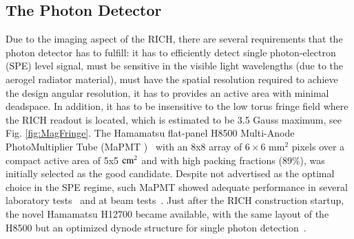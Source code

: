 \documentclass[5p,times,twocolumn]{elsarticle}
\def\MaPMT{MaPMT }
\begin{document}
\subsection{The Photon Detector}
Due to the imaging aspect of the RICH, there are several requirements that the photon detector has to fulfill: it has to efficiently detect single photon-electron (SPE) level signal, must be sensitive in the visible light wavelengths (due to the aerogel radiator material), must have the spatial resolution required to achieve the design angular resolution, it has to provides an active area with minimal deadspace. 
In addition, it has to be insensitive to the low torus fringe field where the RICH readout is located, which is estimated to be 3.5 Gauss maximum, see Fig. \ref{fig:MagFringe}.
The Hamamatsu flat-panel H8500 Multi-Anode PhotoMultiplier Tube (\MaPMT)~\cite{Ref:H8500} with an 8x8 array of $6 \times 6$ mm$^2$ pixels over a compact active area of 5x5 $\rm cm^2$ and with high packing fractions (89\%), was initially selected as the good candidate.
Despite not advertised as the optimal choice in the SPE regime, such \MaPMT showed adequate performance in several laboratory tests~\cite{MaPMT:test} and at beam tests~\cite{RICH:CERN}.
Just after the RICH construction startup, the novel Hamamatsu
H12700 became available, with the same layout of the H8500 but an optimized dynode structure for single photon detection~\cite{Ref:H12700}.
\end{document}

